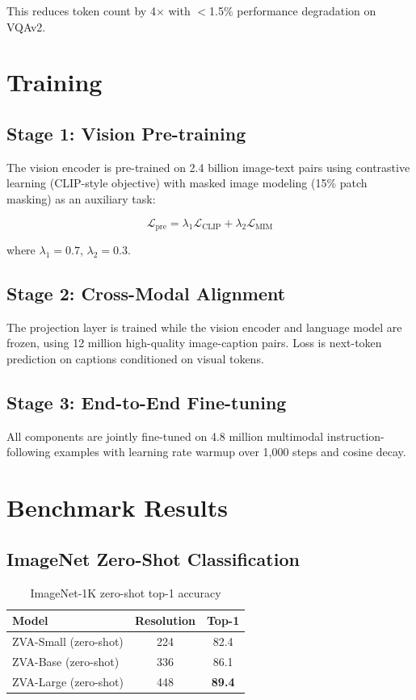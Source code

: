 \documentclass[11pt,a4paper]{article}
\begin{document}
This reduces token count by 4$\times$ with $<$1.5\% performance degradation on VQAv2.

\section{Training}

\subsection{Stage 1: Vision Pre-training}

The vision encoder is pre-trained on 2.4 billion image-text pairs using contrastive learning (CLIP-style objective) with masked image modeling (15\% patch masking) as an auxiliary task:

\begin{equation}
\mathcal{L}_{\text{pre}} = \lambda_1 \mathcal{L}_{\text{CLIP}} + \lambda_2 \mathcal{L}_{\text{MIM}}
\end{equation}

where $\lambda_1 = 0.7$, $\lambda_2 = 0.3$.

\subsection{Stage 2: Cross-Modal Alignment}

The projection layer is trained while the vision encoder and language model are frozen, using 12 million high-quality image-caption pairs. Loss is next-token prediction on captions conditioned on visual tokens.

\subsection{Stage 3: End-to-End Fine-tuning}

All components are jointly fine-tuned on 4.8 million multimodal instruction-following examples with learning rate warmup over 1,000 steps and cosine decay.

\section{Benchmark Results}

\subsection{ImageNet Zero-Shot Classification}

\begin{table}[H]
\centering
\caption{ImageNet-1K zero-shot top-1 accuracy}
\label{tab:imagenet}
\begin{tabular}{lcc}
\toprule
Model & Resolution & Top-1 \\
\midrule
ZVA-Small (zero-shot) & 224 & 82.4 \\
ZVA-Base (zero-shot) & 336 & 86.1 \\
ZVA-Large (zero-shot) & 448 & \textbf{89.4} \\
\bottomrule
\end{tabular}
\end{table}
\end{document}
